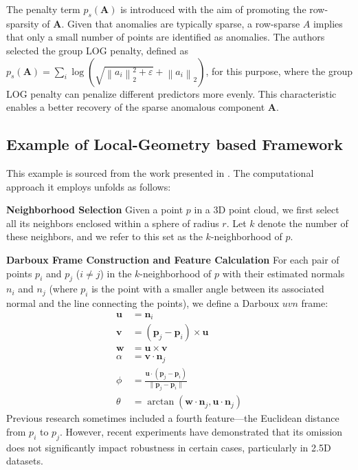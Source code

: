 The penalty term $p_{s}(\mathbf{A})$ is introduced with the aim of promoting the row-sparsity of $\mathbf{A}$. Given that anomalies are typically sparse, a row-sparse $A$ implies that only a small number of points are identified as anomalies. The authors selected the group LOG penalty, defined as $p_{s}(\mathbf{A})=\sum_{i}\log(\sqrt{\left\|a_{i}\right\|_{2}^{2}+\varepsilon}+\left\|a_{i}\right\|_{2})$, for this purpose, where the group LOG penalty can penalize different predictors more evenly. This characteristic enables a better recovery of the sparse anomalous component $\mathbf{A}$. 


\subsection{Example of Local-Geometry based Framework}
This example is sourced from the work presented in \cite{rusu2009fast}. The computational approach it employs unfolds as follows:

\textbf{Neighborhood Selection}
Given a point $p$ in a 3D point cloud, we first select all its neighbors enclosed within a sphere of radius $r$. Let $k$ denote the number of these neighbors, and we refer to this set as the $k$-neighborhood of $p$.

\textbf{Darboux Frame Construction and Feature Calculation}
For each pair of points $p_i$ and $p_j$ ($i \neq j$) in the $k$-neighborhood of $p$ with their estimated normals $n_i$ and $n_j$ (where $p_i$ is the point with a smaller angle between its associated normal and the line connecting the points), we define a Darboux $uvn$ frame:
\begin{align}
\mathbf{u} &= \mathbf{n}_i \\
\mathbf{v} &= (\mathbf{p}_j - \mathbf{p}_i) \times \mathbf{u} \\
\mathbf{w} &= \mathbf{u} \times \mathbf{v}\\
\alpha &= \mathbf{v} \cdot \mathbf{n}_j \\
\phi &= \frac{\mathbf{u} \cdot (\mathbf{p}_j - \mathbf{p}_i)}{\|\mathbf{p}_j - \mathbf{p}_i\|} \\
\theta &= \arctan(\mathbf{w} \cdot \mathbf{n}_j, \mathbf{u} \cdot \mathbf{n}_j)
\end{align}
Previous research sometimes included a fourth feature—the Euclidean distance from $p_i$ to $p_j$. However, recent experiments have demonstrated that its omission does not significantly impact robustness in certain cases, particularly in 2.5D datasets.

